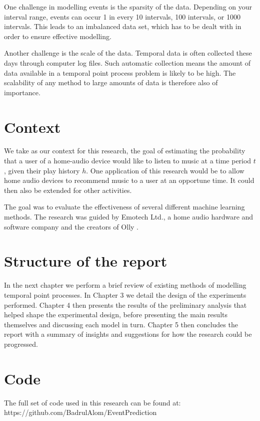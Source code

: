 One challenge in modelling events is the sparsity of the data. Depending on your interval range, events can occur 1 in every 10 intervals, 100 intervals, or 1000 intervals. This leads to an imbalanced data set, which has to be dealt with in order to ensure effective modelling.  

Another challenge is the scale of the data. Temporal data is often collected these days through computer log files. Such automatic collection means the amount of data available in a temporal point process problem is likely to be high. The scalability of any method to large amounts of data is therefore also of importance.

\section{Context}

We take as our context for this research, the goal of estimating the probability that a user of a home-audio device would like to listen to music at a time period $t$, given their play history $h$. One application of this research would be to allow home audio devices to recommend music to a user at an opportune time. It could then also be extended for other activities.

The goal was to evaluate the effectiveness of several different machine learning methods. The research was guided by Emotech Ltd., a home audio hardware and software company and the creators of Olly \parencite{Olly}.

\section{Structure of the report}

In the next chapter we perform a brief review of existing methods of modelling temporal point processes. In Chapter 3 we detail the design of the experiments performed. Chapter 4 then presents the results of the preliminary analysis that helped shape the experimental design, before presenting the main results themselves and discussing each model in turn. Chapter 5 then concludes the report with a summary of insights and suggestions for how the research could be progressed.

\section{Code}

The full set of code used in this research can be found at:
\newline
https://github.com/BadrulAlom/EventPrediction
